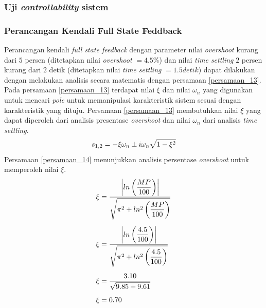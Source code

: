 \documentclass[../main.tex]{subfiles}
\begin{document}
                \subsubsection{Uji \textit{controllability} sistem}
                    
                    
                \subsubsection{Perancangan Kendali Full State Feddback}
                    Perancangan kendali \textit{full state feedback} dengan parameter nilai \textit{overshoot} kurang dari $5$ persen (ditetapkan nilai \textit{overshoot} $ = 4.5\%$) dan nilai \textit{time settling} $2$ persen kurang dari $2$ detik (ditetapkan nilai \textit{time settling} $ = 1.5 detik$) dapat dilakukan dengan melakukan analisis secara matematis dengan persamaan \eqref{persamaan_13}. Pada persamaan \eqref{persamaan_13} terdapat nilai $\xi$ dan nilai $\omega_n$ yang digunakan untuk mencari \textit{pole} untuk memanipulasi karakteristik sistem sesuai dengan karakteristik yang dituju. Persamaan \eqref{persamaan_13} membutuhkan nilai $\xi$ yang dapat diperoleh dari analisis presentase \textit{overshoot} dan nilai $\omega_n$ dari analisis \textit{time settling}.
                    \begin{equation}
                        s_{1,2} = -\xi\omega_n \pm i \omega_n \sqrt{1-\xi^2}\\[5pt]
                        \label{persamaan_13}
                    \end{equation}
                    Persamaan \eqref{persamaan_14} menunjukkan analisis persentase \textit{overshoot} untuk memperoleh nilai $\xi$.
                    \begin{equation}
                        \begin{split}
                            \xi &= \frac{\displaystyle \left|ln\left(\frac{MP}{100}\right)\right|}{\displaystyle \sqrt{\pi^2+ln^2\left(\frac{MP}{100}\right)}} \\[5pt]
                            \xi &= \frac{\displaystyle \left|ln\left(\frac{4.5}{100}\right)\right|}{\displaystyle \sqrt{\pi^2+ln^2\left(\frac{4.5}{100}\right)}}\\[5pt]
                            \xi &= \frac{\displaystyle 3.10}{\displaystyle \sqrt{9.85 + 9.61}} \\[5pt]
                            \xi &= 0.70
                            \label{persamaan_14}
                        \end{split}
                    \end{equation}
\end{document}
